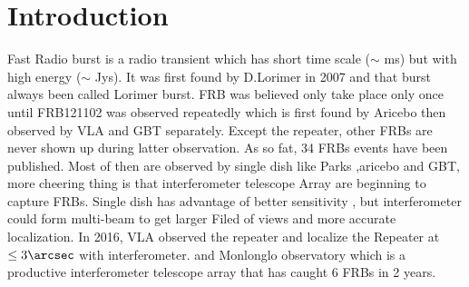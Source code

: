 \documentclass[iop]{emulateapj}
\begin{document}
\begin{abstract}

\end{abstract}



\section{Introduction}
 \label{sec:intro}
Fast Radio burst is a radio transient which has short time scale ($\sim$ ms) but with high energy ($\sim$ Jys). It was first found by D.Lorimer in 2007 and that burst always been called Lorimer burst. FRB was believed only take place only once until FRB121102 was observed repeatedly which is first found by Aricebo then observed by VLA and GBT separately. Except the repeater,  other FRBs are never shown up during latter observation. As so fat, 34 FRBs events have been published. Most of then are observed by single dish like Parks ,aricebo and GBT, more cheering thing is that interferometer telescope Array are beginning to capture FRBs. Single dish has advantage of better sensitivity , but interferometer could form multi-beam to get larger Filed of views and more accurate localization. In 2016,  VLA observed the repeater and localize the Repeater at $\leq 3 \arcsec$ with interferometer. and Monlonglo observatory which is a productive interferometer telescope array that has caught 6 FRBs in 2 years.  
\end{document}
